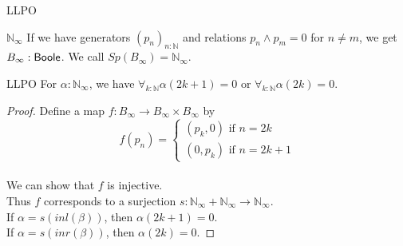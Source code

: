 \begin{frame}{LLPO}
  \begin{exampleblock}{$\mathbb N_\infty$}
    If we have generators $(p_n)_{n:\mathbb N}$ 
    and relations $p_n \wedge p_m = 0$ for 
    $n \neq m$, we get $B_\infty:\mathsf{Boole}$.
    We call $Sp(B_\infty) = \mathbb N_\infty$. 
  \end{exampleblock}
  \begin{block}{LLPO}
    For $\alpha:\mathbb N_\infty$, 
    we have 
    $\forall_{k:\mathbb N} \alpha(2k+1) = 0 $ or 
    $\forall_{k:\mathbb N} \alpha(2k) = 0$.
  \end{block}
  \pause 
  \begin{proof}
    Define a map $f:B_\infty \to B_\infty \times B_\infty $ by 
    \pause 
    \vspace{-0.2cm}
    $$
      f(p_n) = \begin{cases}
        (p_k,0) \text{ if } n = 2k \\
        (0,p_k) \text{ if } n = 2k+1
      \end{cases}
    $$
    \vspace{-0.5 cm}
    \\
    \pause
    We can show that $f$ is injective. 
    \pause \\
    Thus $f$ corresponds to a surjection 
    $s:\mathbb N_\infty +\mathbb N_\infty \to \mathbb N_\infty$. \\
    \pause 
    If $\alpha=s(inl(\beta))$, then $\alpha(2k+1) = 0$. \\
    \pause
    If $\alpha=s(inr(\beta))$, then $\alpha(2k) = 0$. 
  \end{proof}
\end{frame}

